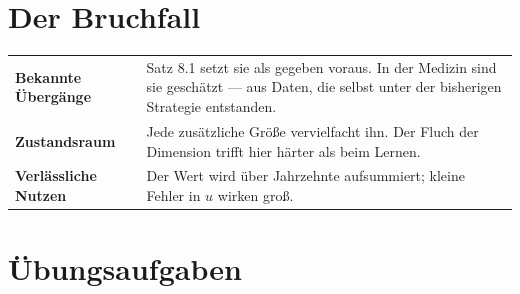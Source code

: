 \section{Der Bruchfall}

\begin{warnung}
\begin{center}
{\small
\renewcommand{\arraystretch}{1.52}
\begin{tabular}{@{}P{3.2cm}P{5.4cm}@{}}
\toprule
\textbf{Bekannte Über\-gänge} & Satz 8.1 setzt sie als gegeben voraus. In der Medizin sind sie geschätzt --- aus Daten, die selbst unter der bisherigen Strategie entstanden.\\
\textbf{Zustandsraum} & Jede zusätzliche Größe vervielfacht ihn. Der Fluch der Dimension trifft hier härter als beim Lernen.\\
\textbf{Verlässliche Nutzen} & Der Wert wird über Jahrzehnte aufsummiert; kleine Fehler in $u$ wirken groß.\\
\bottomrule
\end{tabular}}
\end{center}

\begin{center}
\begin{minipage}{0.88\textwidth}
\end{minipage}
\end{center}
\end{warnung}

\section{Übungsaufgaben}

